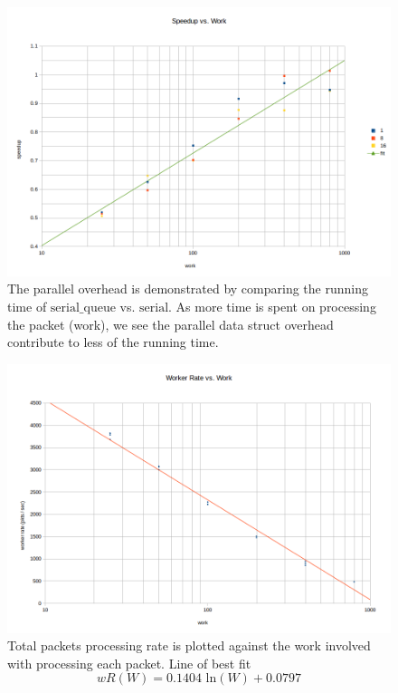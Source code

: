 \documentclass{article}
\newcommand{\code}[1]{\texttt{$\text{#1}$}}
\begin{document}
\begin{figure}
\begin{center}
	\includegraphics[scale=0.5]{speedup_vs_work.png}
	\caption{The parallel overhead is demonstrated by comparing the running time of \code{serial\_queue} vs. \code{serial}. As more time is spent on processing the packet (work), we see the parallel data struct overhead contribute to less of the running time.}
	\label{speedup_vs_work}
\end{center}
\end{figure}

\begin{figure}
\begin{center}
	\includegraphics[scale=0.5]{worker_rate.png}
	\caption{Total packets processing rate is plotted against the work involved with processing each packet. Line of best fit $$wR(W) = 0.1404\text{ ln}(W) + 0.0797$$}
	\label{worker_rate}
\end{center}
\end{figure}
\end{document}
